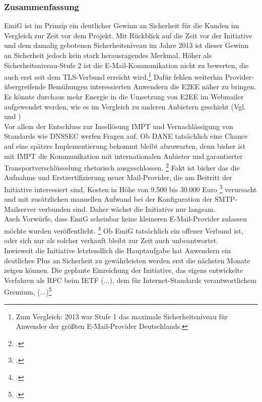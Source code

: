 \documentclass  [paper=a4,
				fontsize=12pt,
				listof=totoc,
				bibliography=totoc
				]{scrreprt}
\begin{document}
		\subsubsection{Zusammenfassung}
			\ac{EmiG} ist im Prinzip ein deutlicher Gewinn an Sicherheit für die Kunden im Vergleich zur Zeit vor dem Projekt. 
			Mit Rückblick auf die Zeit vor der Initiative und dem damalig gebotenen Sicherheitsniveau im Jahre 2013 ist dieser Gewinn an Sicherheit jedoch kein stark herausragendes Merkmal.
			Höher als Sicherheitsniveau-Stufe 2 ist die E-Mail-Kommunikation nicht zu bewerten, die auch erst seit dem \ac{TLS}-Verbund erreicht wird.\footnote{Zum Vergleich: 2013 war Stufe 1 das maximale Sicherheitsniveau für Anwender der größten E-Mail-Provider Deutschlands.}
			Dafür fehlen weiterhin Provider-übergreifende Bemühungen interessierten Anwendern die \ac{E2EE} näher zu bringen.
			Es könnte durchaus mehr Energie in die Umsetzung von \ac{E2EE} im Webmailer aufgewendet werden, wie es im Vergleich zu anderen Anbietern geschieht (Vgl.  und ) \medskip\\
			Vor allem der Entschluss zur Insellösung \ac{IMPT} und Vernachlässigung von Standards wie \ac{DNSSEC} werfen Fragen auf. 
			Ob \ac{DANE} tatsächlich eine Chance auf eine spätere Implementierung bekommt bleibt abzuwarten, denn bisher ist mit \ac{IMPT} die Kommunikation mit internationalen Anbieter und garantierter Transportverschlüsselung rhetorisch ausgeschlossen.
			\footcite[Vgl.][]{Zivadino14-1}
			Fakt ist bisher das die Aufnahme und Erstzertifizierung neuer Mail-Provider, die am Beitritt der Initiative interessiert sind, Kosten in Höhe von 9.500 bis 30.000 Euro
			\footcite[Vgl.][]{Zivadino14-3} 
			verursacht und mit zusätzlichen manuellen Aufwand bei der Konfiguration der \ac{SMTP}-Mailserver verbunden sind.
			Daher wächst die Initiative nur langsam.\\
			Auch Vorwürfe, dass \ac{EmiG} scheinbar keine kleineren E-Mail-Provider zulassen möchte wurden veröffentlicht.
			\footcite[Vgl.][]{Zivadino14-4}
			Ob \ac{EmiG} tatsächlich ein offener Verbund ist, oder sich nur als solcher verkauft bleibt zur Zeit auch unbeantwortet. \medskip\\
			Inwieweit die Initiative letztendlich die Hauptaufgabe hat Anwendern ein deutliches Plus an Sicherheit zu gewährleisten werden erst die nächsten Monate zeigen können.
			Die geplante Einreichung der Initiative, das eigens entwickelte Verfahren als \ac{RFC} beim \ac{IETF} \glqq (...), dem für Internet-Standards verantwortlichem Gremium, (...)\grqq\footcite[Vgl.][]{Zivadino14-2}
\end{document}

